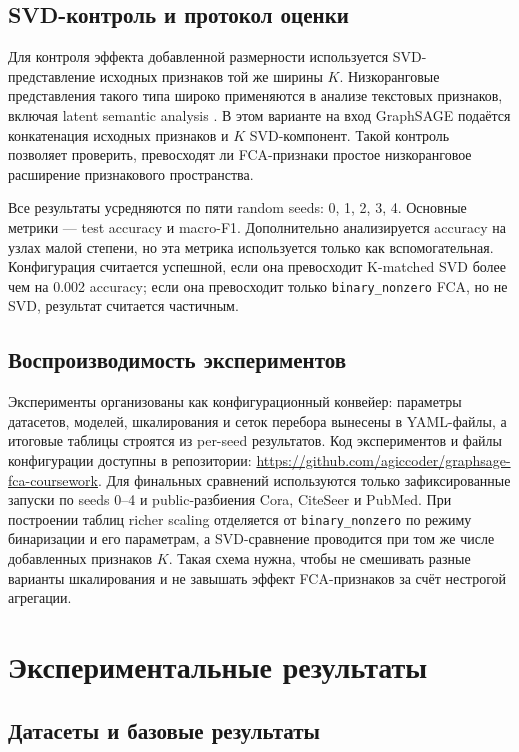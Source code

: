 \documentclass[14pt,a4paper]{extarticle}
\begin{document}
\subsection{SVD-контроль и протокол оценки}

Для контроля эффекта добавленной размерности используется SVD-представление
исходных признаков той же ширины $K$. Низкоранговые представления такого типа
широко применяются в анализе текстовых признаков, включая latent semantic
analysis \cite{deerwester1990lsa}. В этом варианте на вход GraphSAGE подаётся
конкатенация исходных признаков и $K$ SVD-компонент. Такой контроль позволяет
проверить, превосходят ли FCA-признаки простое низкоранговое расширение
признакового пространства.

Все результаты усредняются по пяти random seeds: 0, 1, 2, 3, 4. Основные метрики
--- test accuracy и macro-F1. Дополнительно анализируется accuracy на узлах
малой степени, но эта метрика используется только как вспомогательная.
Конфигурация считается успешной, если она превосходит K-matched SVD более чем на
0.002 accuracy; если она превосходит только \texttt{binary\_nonzero} FCA, но не
SVD, результат считается частичным.

\subsection{Воспроизводимость экспериментов}

Эксперименты организованы как конфигурационный конвейер: параметры датасетов,
моделей, шкалирования и сеток перебора вынесены в YAML-файлы, а итоговые таблицы
строятся из per-seed результатов. Код экспериментов и файлы конфигурации доступны
в репозитории: \url{https://github.com/agiccoder/graphsage-fca-coursework}. Для
финальных сравнений используются только зафиксированные запуски по seeds 0--4 и
public-разбиения Cora, CiteSeer и PubMed. При построении таблиц richer scaling
отделяется от \texttt{binary\_nonzero} по режиму бинаризации и его параметрам, а
SVD-сравнение проводится при том же числе добавленных признаков $K$. Такая схема
нужна, чтобы не смешивать разные варианты шкалирования и не завышать эффект
FCA-признаков за счёт нестрогой агрегации.

\section{Экспериментальные результаты}

\subsection{Датасеты и базовые результаты}
\end{document}
